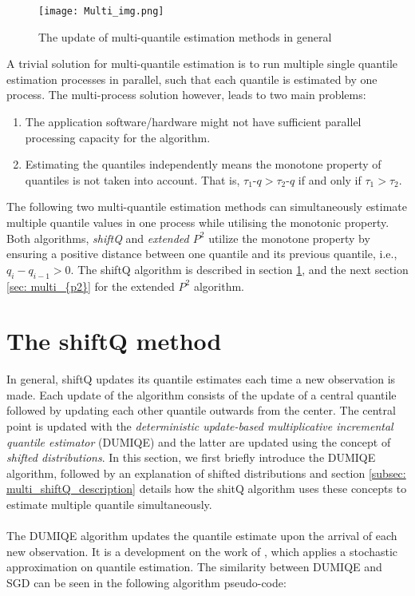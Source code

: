 \begin{figure}[h]
    \centering
	\texttt{[image: Multi\_img.png]}
	\caption{The update of multi-quantile estimation methods in general}
\end{figure}

A trivial solution for multi-quantile estimation is to run multiple single quantile estimation processes in parallel, such that each quantile is estimated by one process. The multi-process solution however, leads to two main problems:
\begin{enumerate}
    \item The application software/hardware might not have sufficient parallel processing capacity for the algorithm.
    \item Estimating the quantiles independently means the monotone property of quantiles is not taken into account. That is, $\tau_1$-$q > \tau_2$-$q$ if and only if $\tau_1 > \tau_2.$
\end{enumerate}

The following two multi-quantile estimation methods can simultaneously estimate multiple quantile values in one process while utilising the monotonic property. Both algorithms, \textit{shiftQ}\cite{hammerJointTrackingMultiple2019b} and \textit{extended $P^2$}\cite{raatikainenSequentialProcedureSimultaneous1993} utilize the monotone property by ensuring a positive distance between one quantile and its previous quantile, i.e.,
$q_{i} - q_{i-1} > 0$. The shiftQ algorithm is described in section \ref{sec: multi_shiftQ}, and the next section \ref{sec: multi_{p2}} for the extended $P^2$ algorithm.




\section{The shiftQ method}
\label{sec: multi_shiftQ}

In general, shiftQ updates its quantile estimates each time a new observation is made. Each update of the algorithm consists of the update of a central quantile followed by updating each other quantile outwards from the center. The central point is updated with the \emph{deterministic update-based multiplicative incremental quantile estimator} (DUMIQE) and the latter are updated using the concept of \emph{shifted distributions}. In this section, we first briefly introduce the DUMIQE algorithm, followed by an explanation of shifted distributions and section \ref{subsec: multi_shiftQ_description} details how the shitQ algorithm uses these concepts to estimate multiple quantile simultaneously.
\\\\
The DUMIQE algorithm updates the quantile estimate upon the arrival of each new observation. It is a development on the work of \citeauthor{tierneySpaceEfficientRecursiveProcedure1983}\cite{tierneySpaceEfficientRecursiveProcedure1983}, which applies a stochastic approximation on quantile estimation. The similarity between DUMIQE and SGD can be seen in the following algorithm pseudo-code:

